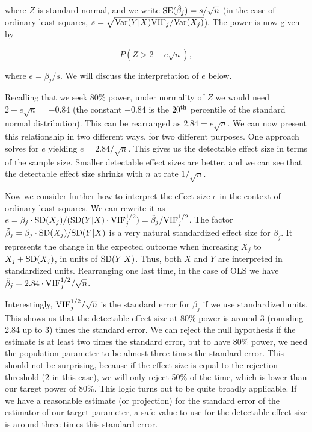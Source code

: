 \noindent where $Z$ is standard normal, and we write ${\rm SE}(\hat{\beta}_j) = s / \sqrt{n}$ (in the case of ordinary least squares, $s = \sqrt{{\rm Var}(Y|X){\rm VIF}_j / {\rm Var}(X_j)}$).  The power is now given by

$$
P(Z > 2 - e \sqrt{n}),
$$

\noindent where $e = \beta_j / s$.  We will discuss the interpretation of $e$ below.

Recalling that we seek 80\% power, under normality of $Z$ we would need $2 - e \sqrt{n}  = -0.84$ (the constant $-0.84$ is the $20^{\rm th}$ percentile of the standard normal distribution).  This can be rearranged as
$2.84 = e \sqrt{n}$.  We can now present this relationship in two different ways, for two different purposes.  One approach solves for $e$ yielding $e = 2.84 / \sqrt{n}$.  This gives us the detectable effect size in terms of the sample size.  Smaller detectable effect sizes are better, and we can see that the detectable effect size shrinks with $n$ at rate $1/\sqrt{n}$.

Now we consider further how to interpret the effect size $e$ in the context of ordinary least squares. We can rewrite it as $e = \beta_j\cdot {\rm SD}(X_j) / ({\rm SD}(Y|X) \cdot {\rm VIF}_j^{1/2}) = \tilde{\beta}_j / {\rm VIF}_j^{1/2}$.  The factor $\tilde{\beta}_j = \beta_j \cdot {\rm SD}(X_j) / {\rm SD}(Y|X)$ is a very natural standardized effect size for $\beta_j$.  It represents the change in the expected outcome when increasing $X_j$ to $X_j + {\rm SD}(X_j)$, in units of ${\rm SD}(Y|X)$.  Thus, both $X$ and $Y$ are interpreted in standardized units.  Rearranging one last time, in the case of OLS we have $\tilde{\beta}_j = 2.84 \cdot{\rm VIF}_j^{1/2} / \sqrt{n}$.

Interestingly, ${\rm VIF}_j^{1/2} / \sqrt{n}$ is the standard error for $\beta_j$ if we use standardized units.  This shows us that the detectable effect size at 80\% power is around 3 (rounding 2.84 up to 3) times the standard error.  We can reject the null hypothesis if the estimate is at least two times the standard error, but to have 80\% power, we need the population parameter to be almost three times the standard error.  This should not be surprising, because if the effect size is equal to the rejection threshold (2 in this case), we will only reject 50\% of the time, which is lower than our target power of 80\%. This logic turns out to be quite broadly applicable.  If we have a reasonable estimate (or projection) for the standard error of the estimator of our target parameter, a safe value to use for the detectable effect size is around three times this standard error.

